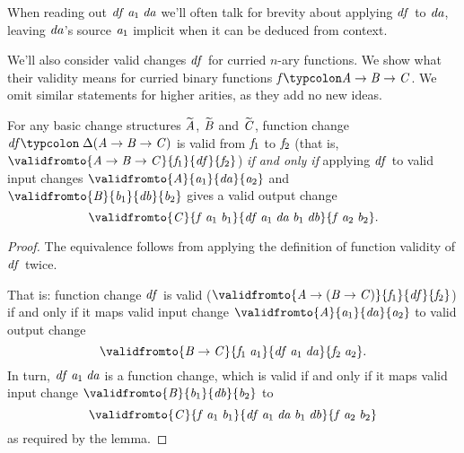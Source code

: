 
\begin{notation}
  When reading out \ensuremath{\Varid{df}\;\Varid{a}_{1}\;\Varid{da}} we'll often talk for brevity about applying \ensuremath{\Varid{df}}
  to \ensuremath{\Varid{da}}, leaving \ensuremath{\Varid{da}}'s source \ensuremath{\Varid{a}_{1}} implicit when it can be deduced from
  context.
\end{notation}

We'll also consider valid changes \ensuremath{\Varid{df}} for curried $n$-ary functions. We show
what their validity means for curried binary functions \ensuremath{\Varid{f}\typcolon\Conid{A}\to \Conid{B}\to \Conid{C}}. We
omit similar statements for higher arities, as they add no new ideas.
\begin{lemma}
  \label{lem:validity-binary-functions}
  For any basic change structures \ensuremath{\widetilde{\Conid{A}}}, \ensuremath{\widetilde{\Conid{B}}} and \ensuremath{\widetilde{\Conid{C}}}, function
  change \ensuremath{\Varid{df}\typcolon\;\Delta (\Conid{A}\to \Conid{B}\to \Conid{C})} is valid from \ensuremath{\Varid{f}_{1}} to \ensuremath{\Varid{f}_{2}} (that is, \ensuremath{\validfromto{\Conid{A}\to \Conid{B}\to \Conid{C}}{\Varid{f}_{1}}{\Varid{df}}{\Varid{f}_{2}}}) \emph{if and only if} applying \ensuremath{\Varid{df}} to valid input
  changes \ensuremath{\validfromto{\Conid{A}}{\Varid{a}_{1}}{\Varid{da}}{\Varid{a}_{2}}} and \ensuremath{\validfromto{\Conid{B}}{\Varid{b}_{1}}{\Varid{db}}{\Varid{b}_{2}}} gives a valid output change
  \[\ensuremath{\validfromto{\Conid{C}}{\Varid{f}\;\Varid{a}_{1}\;\Varid{b}_{1}}{\Varid{df}\;\Varid{a}_{1}\;\Varid{da}\;\Varid{b}_{1}\;\Varid{db}}{\Varid{f}\;\Varid{a}_{2}\;\Varid{b}_{2}}}.\]
\end{lemma}
\begin{proof}
  The equivalence follows from applying the definition of function validity of \ensuremath{\Varid{df}} twice.

  That is: function change \ensuremath{\Varid{df}} is valid (\ensuremath{\validfromto{\Conid{A}\to (\Conid{B}\to \Conid{C})}{\Varid{f}_{1}}{\Varid{df}}{\Varid{f}_{2}}}) if
  and only if it maps valid input change \ensuremath{\validfromto{\Conid{A}}{\Varid{a}_{1}}{\Varid{da}}{\Varid{a}_{2}}} to valid output
  change
  \[\ensuremath{\validfromto{\Conid{B}\to \Conid{C}}{\Varid{f}_{1}\;\Varid{a}_{1}}{\Varid{df}\;\Varid{a}_{1}\;\Varid{da}}{\Varid{f}_{2}\;\Varid{a}_{2}}}.
  \]
  In turn, \ensuremath{\Varid{df}\;\Varid{a}_{1}\;\Varid{da}} is a function change, which is valid if and only if
  it maps valid input change \ensuremath{\validfromto{\Conid{B}}{\Varid{b}_{1}}{\Varid{db}}{\Varid{b}_{2}}} to
  \[\ensuremath{\validfromto{\Conid{C}}{\Varid{f}\;\Varid{a}_{1}\;\Varid{b}_{1}}{\Varid{df}\;\Varid{a}_{1}\;\Varid{da}\;\Varid{b}_{1}\;\Varid{db}}{\Varid{f}\;\Varid{a}_{2}\;\Varid{b}_{2}}}\]
  as required by the lemma.
\end{proof}

